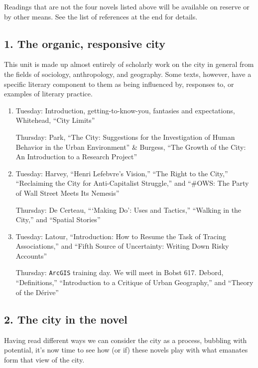 Readings that are not the four novels listed above will be available on reserve
or by other means. See the list of references at the end for details.

\subsection*{1. The organic, responsive city}

  This unit is made up almost entirely of scholarly work on the city in general
  from the fields of sociology, anthropology, and geography. Some texts,
  however, have a specific literary component to them as being influenced by,
  responses to, or examples of literary practice. 

\begin{enumerate}

  \item Tuesday: Introduction, getting-to-know-you, fantasies and expectations,
    Whitehead, “City Limits”

    Thursday: Park, “The City: Suggestions for the Investigation of Human Behavior in the Urban Environment” \& Burgess, “The Growth of the City: An Introduction to a Research Project”

  \item Tuesday: Harvey, “Henri Lefebvre’s Vision,” “The Right to the City,” “Reclaiming the City for Anti-Capitalist Struggle,” and “\#OWS: The Party of Wall Street Meets Its Nemesis”

    Thursday: De Certeau, “‘Making Do’: Uses and Tactics,” “Walking in the City,” and “Spatial Stories”

  \item Tuesday: Latour, “Introduction: How to Resume the Task of Tracing Associations,” and “Fifth Source of Uncertainty: Writing Down Risky Accounts”

    Thursday: \texttt{ArcGIS} training day. We will meet in Bobst 617. Debord, “Definitions,” “Introduction to a Critique of Urban Geography,” and “Theory of the Dérive”

\end{enumerate}

\subsection*{2. The city in the novel}

Having read different ways we can consider the city as a process, bubbling with
potential, it’s now time to see how (or if) these novels play with what
emanates form that view of the city.

